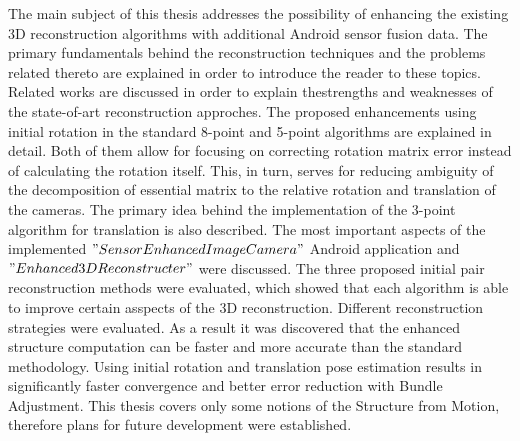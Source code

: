 


\begin{abstracts}        %

The main subject of this thesis addresses the possibility of enhancing the existing 3D reconstruction algorithms with additional Android sensor fusion data. The primary fundamentals behind the reconstruction techniques and the problems related thereto are explained in order to introduce the reader to these topics. Related works are discussed in order to explain thestrengths and weaknesses of the state-of-art reconstruction approches. The proposed enhancements using initial rotation in the standard 8-point and 5-point algorithms are explained in detail. Both of them allow for focusing on correcting rotation matrix error instead of calculating the rotation itself. This, in turn, serves for reducing ambiguity of the decomposition of essential matrix to the relative rotation and translation of the cameras. The primary idea behind the implementation of the 3-point algorithm for translation is also described. The most important aspects of the implemented $"Sensor Enhanced Image Camera"$ Android application and $"Enhanced 3D Reconstructer"$ were discussed.
The three proposed initial pair reconstruction methods were evaluated, which showed that each algorithm is able to improve certain asspects of the 3D reconstruction. Different reconstruction strategies were evaluated. As a result it was discovered that the enhanced structure computation can be faster and more accurate than the standard methodology. Using initial rotation and translation pose estimation results in significantly faster convergence and better error reduction with Bundle Adjustment. This thesis covers only some notions of the Structure from Motion, therefore plans for future development were  established.

\end{abstracts}
\clearpage
\renewcommand{\abstractname}{Zusammenfassung}
